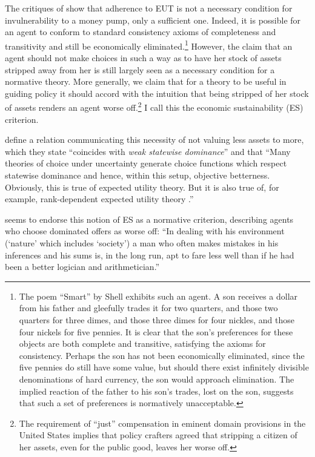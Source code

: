 \documentclass[../main.tex]{subfiles}
\begin{document}
The critiques of \textcite{Cubitt2001} show that adherence to EUT is not a necessary condition for invulnerability to a money pump, only a sufficient one.
Indeed, it is possible for an agent to conform to standard consistency axioms of completeness and transitivity and still be economically eliminated.\footnote{
	The poem \enquote{Smart} by Shell \textcite{Silverstein1974} exhibits such an agent.
	A son receives a dollar from his father and gleefully trades it for two quarters, and those two quarters for three dimes, and those three dimes for four nickles, and those four nickels for five pennies.
	It is clear that the son's preferences for these objects are both complete and transitive, satisfying the axioms for consistency.
	Perhaps the son has not been economically eliminated, since the five pennies do still have some value, but should there exist infinitely divisible denominations of hard currency, the son would approach elimination.
	The implied reaction of the father to his son's trades, lost on the son, suggests that such a set of preferences is normatively unacceptable.
}
However, the claim that an agent should not make choices in such a way as to have her stock of assets stripped away from her is still largely seen as a necessary condition for a normative theory.
More generally, we claim that for a theory to be useful in guiding policy it should accord with the intuition that being stripped of her stock of assets renders an agent worse off.\footnote{
	The requirement of \enquote{just} compensation in eminent domain provisions in the United States implies that policy crafters agreed that stripping a citizen of her assets, even for the public good, leaves her worse off.
}
I call this the economic sustainability (ES) criterion.

\textcite[141]{Cubitt2001} define a relation communicating this necessity of not valuing less assets to more, which they state \enquote{coincides with \textit{weak statewise dominance}} and that
\enquote{Many theories of choice under uncertainty generate choice functions which respect statewise dominance and hence, within this setup, objective betterness.
	Obviously, this is true of expected utility theory.
	But it is also true of, for example, \textcite{Quiggin1982} rank-dependent expected utility theory .}

\textcite[112]{Marschak1950} seems to endorse this notion of ES as a normative criterion, describing agents who choose dominated offers as worse off:
\enquote{In dealing with his environment (\enquote{nature} which includes \enquote{society}) a man who often makes mistakes in his inferences and his sums is, in the long run, apt to fare less well than if he had been a better logician and arithmetician.}
\end{document}

